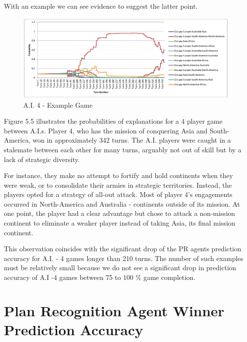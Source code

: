 \documentclass[parskip]{cs4rep}
\begin{document}
With an example we can see evidence to suggest the latter point. 

\newpage

\begin{figure}[h]
\centerline{
\includegraphics[width=1.1\textwidth]{images/bad-long-game.pdf}
}
\caption{A.I. 4 - Example Game}
\label{fig:dom-debug-gui}
\end{figure}

Figure 5.5 illustrates the probabilities of explanations for a 4 player game between A.I.s. Player 4,  who has the mission of conquering Asia and South-America, won in approximately 342 turns. The A.I. players were caught in a stalemate between each other for many turns, arguably not out of skill but by a lack of strategic diversity. 

For instance, they make no attempt to fortify and hold continents when they were weak, or to consolidate their armies in strategic territories. Instead, the players opted for a strategy of all-out attack. Most of player 4's engagements occurred in North-America and Australia - continents outside of its mission. At one point, the player had a clear advantage but chose to attack a non-mission continent to eliminate a weaker player instead of taking Asia, its final mission continent. 

This observation coincides with the significant drop of the PR agents prediction accuracy for A.I. - 4 games longer than 210 turns. The number of such examples must be relatively small because we do not see a significant drop in prediction accuracy of A.I -4 games between 75 to 100 \% game completion.

\newpage

\section{Plan Recognition Agent Winner Prediction Accuracy}
\end{document}
